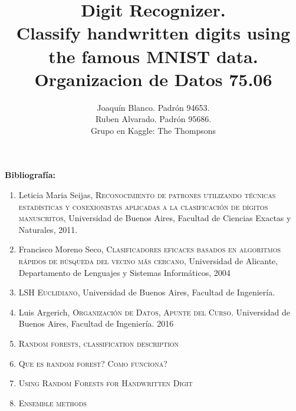 \documentclass[a4paper,11pt]{report}
\title{Digit Recognizer. \\ 
  Classify handwritten digits using the famous MNIST data.\\
  Organizacion de Datos 75.06}
\author{Joaquín Blanco. Padrón 94653.\\
  Ruben Alvarado. Padrón 95686.\\
  Grupo en Kaggle: The Thompsons}
\begin{document}
\maketitle
\tableofcontents






\textbf{Bibliografía:}
\begin{enumerate}
  \item Leticia Maria Seijas, \textsc{Reconocimiento de patrones utilizando técnicas estadísticas y conexionistas aplicadas a la clasificación de dígitos manuscritos}, Universidad de Buenos Aires, Facultad de Ciencias Exactas y Naturales, 2011.
  \item Francisco Moreno Seco, \textsc{Clasificadores eficaces basados en algoritmos rápidos de búsqueda del vecino más cercano}, Universidad de Alicante, Departamento de Lenguajes y Sistemas Informáticos, 2004
  \item \textsc{LSH Euclidiano}, Universidad de Buenos Aires, Facultad de Ingeniería.
  \item Luis Argerich, \textsc{Organización de Datos, Apunte del Curso.} Universidad de Buenos Aires, Facultad de Ingeniería. 2016
  \item \textsc{Random forests, classification description} 
  \item \textsc{Que es random forest? Como funciona?}
  \item \textsc{Using Random Forests for Handwritten Digit}
  \item \textsc{Ensemble methods}
\end{enumerate}
\end{document}
